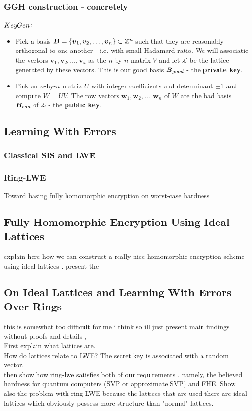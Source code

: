 \subsubsection*{GGH construction - concretely}
$KeyGen$:
\begin{itemize}
    \item Pick a basis $\boldsymbol{B} = \{\boldsymbol{v}_1, \boldsymbol{v}_2, \dots, \boldsymbol{v}_n\} \subset \mathbb{Z}^n$ such that they are reasonably orthogonal to one another - i.e. with small Hadamard ratio. We will associatie the vectors $\bm{v}_1, \bm{v}_2, \dots, \bm{v}_n$ as the $n$-by-$n$ matrix $V$ and let $\mathcal{L}$ be the lattice generated by these vectors. This is our good basis $\boldsymbol{B}_{good}$ - the \textbf{private key}.
    \item Pick an $n$-by-$n$ matrix $U$ with integer coefficients and determinant $\pm 1$ and compute $W = UV$. The row vectors $\bm{w}_1, \bm{w}_2, \dots, \bm{w}_n$ of $W$ are the bad basis $\boldsymbol{B}_{bad}$ of $\mathcal{L}$ - the \textbf{public key}.
\end{itemize}

\subsection{Learning With Errors}
\subsubsection*{Classical SIS and LWE}
\subsubsection*{Ring-LWE}
Toward basing fully homomorphic encryption on worst-case hardness

\subsection{Fully Homomorphic Encryption Using Ideal Lattices}
explain here how we can construct a really nice homomorphic encryption scheme using ideal lattices \cite{gentry}. present the 
\subsection{On Ideal Lattices and Learning With Errors Over Rings}
this is somewhat too difficult for me i think so ill just present main findings without proofs and details \cite{regev}, \cite{ring-lwe} \\
First explain what lattices are. \\
How do lattices relate to LWE? The secret key is associated with a random vector. \\
then show how ring-lwe satisfies both of our requirements \cite{ring-lwe}, namely, the believed hardness for quantum computers (SVP or approximate SVP) and FHE. Show also the problem with ring-LWE because the lattices that are used there are ideal lattices which obviously possess more structure than "normal" lattices.
